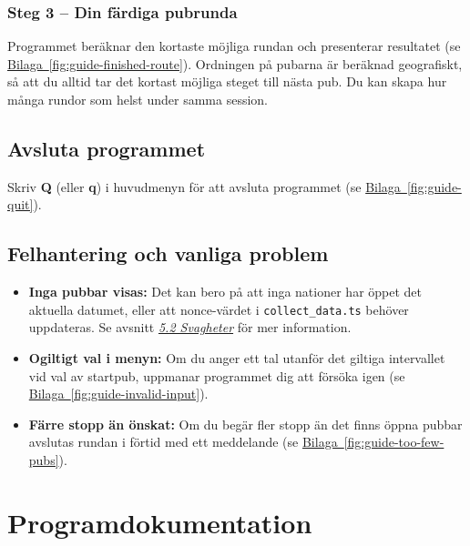 \documentclass[a4paper, 12pt]{article}
\begin{document}
        \subsubsection*{Steg 3 -- Din färdiga pubrunda}

        Programmet beräknar den kortaste möjliga rundan och presenterar resultatet (se \hyperref[fig:guide-finished-route]{Bilaga~\ref*{fig:guide-finished-route}}). Ordningen på pubarna är beräknad geografiskt, så att du alltid tar det kortast möjliga steget till nästa pub. Du kan skapa hur många rundor som helst under samma session.

    \subsection{Avsluta programmet}

        Skriv \textbf{Q} (eller \textbf{q}) i huvudmenyn för att avsluta programmet (se \hyperref[fig:guide-quit]{Bilaga~\ref*{fig:guide-quit}}).

    \subsection{Felhantering och vanliga problem}

        \begin{itemize}
            \item \textbf{Inga pubbar visas:} Det kan bero på att inga nationer har öppet det aktuella datumet, eller att nonce-värdet i \texttt{collect\_data.ts} behöver uppdateras. Se avsnitt \hyperref[subsec: svagheter]{\textit{5.2 Svagheter}} för mer information.
            \item \textbf{Ogiltigt val i menyn:} Om du anger ett tal utanför det giltiga intervallet vid val av startpub, uppmanar programmet dig att försöka igen (se \hyperref[fig:guide-invalid-input]{Bilaga~\ref*{fig:guide-invalid-input}}).
            \item \textbf{Färre stopp än önskat:} Om du begär fler stopp än det finns öppna pubbar avslutas rundan i förtid med ett meddelande (se \hyperref[fig:guide-too-few-pubs]{Bilaga~\ref*{fig:guide-too-few-pubs}}).
        \end{itemize}

\section{Programdokumentation}
\label{sec: dokumentation}
\end{document}
